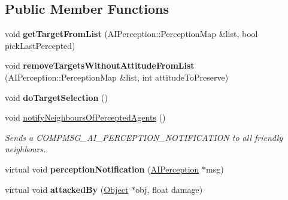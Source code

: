 \subsection*{\-Public \-Member \-Functions}
\begin{DoxyCompactItemize}
\item 
\hypertarget{classAIHandlerBattleSphere_a93f449f40f6d0f953d1eabe2a0f0d4c9}{
void {\bfseries get\-Target\-From\-List} (\-A\-I\-Perception\-::\-Perception\-Map \&list, bool pick\-Last\-Percepted)}
\label{dc/dfb/classAIHandlerBattleSphere_a93f449f40f6d0f953d1eabe2a0f0d4c9}

\item 
\hypertarget{classAIHandlerBattleSphere_a36eeb738095cf0405a2cb7ebc429dd29}{
void {\bfseries remove\-Targets\-Without\-Attitude\-From\-List} (\-A\-I\-Perception\-::\-Perception\-Map \&list, int attitude\-To\-Preserve)}
\label{dc/dfb/classAIHandlerBattleSphere_a36eeb738095cf0405a2cb7ebc429dd29}

\item 
\hypertarget{classAIHandlerBattleSphere_a4c44c7ffcd5a6037e9cdd57e141fba03}{
void {\bfseries do\-Target\-Selection} ()}
\label{dc/dfb/classAIHandlerBattleSphere_a4c44c7ffcd5a6037e9cdd57e141fba03}

\item 
\hypertarget{classAIHandlerBattleSphere_a5575087f4971bd2437901bf6376e2fd0}{
void \hyperlink{classAIHandlerBattleSphere_a5575087f4971bd2437901bf6376e2fd0}{notify\-Neighbours\-Of\-Percepted\-Agents} ()}
\label{dc/dfb/classAIHandlerBattleSphere_a5575087f4971bd2437901bf6376e2fd0}

\begin{DoxyCompactList}\small\item\em \-Sends a \-C\-O\-M\-P\-M\-S\-G\-\_\-\-A\-I\-\_\-\-P\-E\-R\-C\-E\-P\-T\-I\-O\-N\-\_\-\-N\-O\-T\-I\-F\-I\-C\-A\-T\-I\-O\-N to all friendly neighbours. \end{DoxyCompactList}\item 
\hypertarget{classAIHandlerBattleSphere_a923f4aad98f8b38afb2b2076d9258a4a}{
virtual void {\bfseries perception\-Notification} (\hyperlink{classAIPerception}{\-A\-I\-Perception} $\ast$msg)}
\label{dc/dfb/classAIHandlerBattleSphere_a923f4aad98f8b38afb2b2076d9258a4a}

\item 
\hypertarget{classAIHandlerBattleSphere_a717d860dd0e442cb6952a1bd7f7d29a7}{
virtual void {\bfseries attacked\-By} (\hyperlink{classObject}{\-Object} $\ast$obj, float damage)}
\label{dc/dfb/classAIHandlerBattleSphere_a717d860dd0e442cb6952a1bd7f7d29a7}


\end{DoxyCompactItemize}
